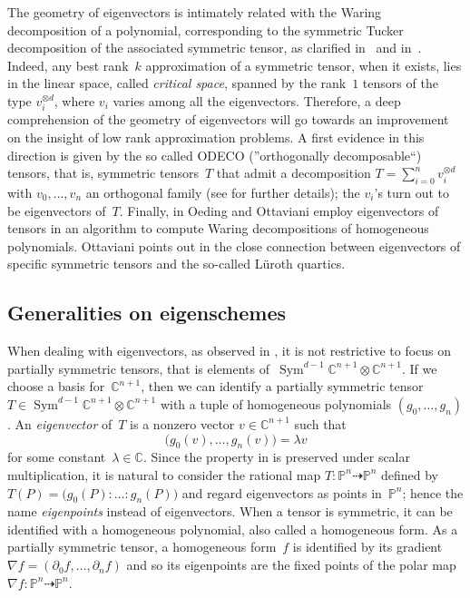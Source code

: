 \documentclass[a4paper, 11pt, reqno]{amsart}
\theoremstyle{plain}
\theoremstyle{definition}
\newcommand{\C}{\mathbb{C}}
\newcommand{\p}{\mathbb{P}}
\newcommand{\de}{\partial}
\newcommand{\Sym}{\operatorname{Sym}}
\begin{document}
The geometry of eigenvectors is intimately related with the Waring decomposition of a polynomial, 
corresponding to the symmetric Tucker decomposition of the associated symmetric tensor, 
as clarified in~\cite{DOT} and in~\cite{Ott}. 
Indeed, any best rank~$k$ approximation of a symmetric tensor, when it exists, lies in the linear space, 
called \emph{critical space}, spanned by the rank~$1$ tensors of the type $v_i^{\otimes d}$, where $v_i$ varies among all the eigenvectors. 
Therefore, a deep comprehension of the geometry of eigenvectors will
go towards an improvement on the insight of low rank approximation problems.
A first evidence in this direction is given by the so called ODECO (''orthogonally decomposable``) tensors, 
that is, symmetric tensors~$T$ that admit a decomposition
$T = \sum _{i=0}^n v_i ^{\otimes d}$ with $v_0, \dotsc, v_n$ an orthogonal family (see \cite{Rob, BDHE} for further details);
the $v_i$'s turn out to be eigenvectors of~$T$.
Finally, in \cite{OO} Oeding and Ottaviani employ eigenvectors of tensors in an algorithm to compute Waring decompositions of homogeneous polynomials.
Ottaviani points out in \cite[Section~8]{Ottaviani24} the close connection between eigenvectors of specific symmetric tensors and the so-called L\"uroth quartics. 

\subsection*{Generalities on eigenschemes}
When dealing with eigenvectors, as observed in \cite{ASS},
it is not restrictive to focus on partially symmetric tensors, that is elements of~$\Sym^{d-1}\C^{n+1} \otimes \C^{n+1}$.
If we choose a basis for~$\C^{n+1}$, then we can identify a partially symmetric tensor $T \in \Sym^{d-1}\C^{n+1} \otimes \C^{n+1}$ with a tuple of homogeneous polynomials $(g_0, \dotsc, g_n)$. An \emph{eigenvector} of~$T$ is a nonzero vector $v \in \C^{n+1}$ such that
%
\begin{equation}
\label{eq:eigenvector_definition}
  \bigl( g_0(v), \dotsc, g_n(v) \bigr) = \lambda v
\end{equation}
%
for some constant~$\lambda \in \C$.
Since the property in  is preserved under scalar multiplication, 
it is natural to consider the rational map $T \colon \p^n \dashrightarrow \p^n$ defined by $T(P) = \bigl(g_0(P): \ldots: g_n(P)\bigr)$ 
and regard eigenvectors as points in~$\p^n$; hence the name \emph{eigenpoints} instead of eigenvectors.
When a tensor is symmetric, it can be identified with a homogeneous polynomial, also called a homogeneous form.
As a partially symmetric tensor, a homogeneous form~$f$ is identified by its gradient $\nabla f = (\de_0 f, \dotsc, \de_n f)$ and so its eigenpoints are the fixed points of the polar map $\nabla f \colon \p^n \dasharrow \p^n$.
\end{document}
